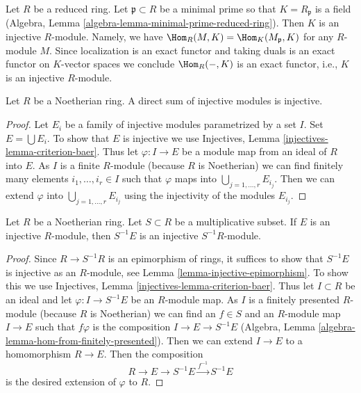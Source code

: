 \begin{example}
\label{example-reduced-ring-injective}
Let $R$ be a reduced ring. Let $\mathfrak p \subset R$ be a minimal prime
so that $K = R_\mathfrak p$ is a field
(Algebra, Lemma \ref{algebra-lemma-minimal-prime-reduced-ring}).
Then $K$ is an injective $R$-module. Namely, we have
$\Hom_R(M, K) = \Hom_K(M_\mathfrak p, K)$ for any $R$-module
$M$. Since localization is an exact functor and taking duals is
an exact functor on $K$-vector spaces we conclude $\Hom_R(-, K)$
is an exact functor, i.e., $K$ is an injective $R$-module.
\end{example}

\begin{lemma}
\label{lemma-sum-injective-modules}
Let $R$ be a Noetherian ring. A direct sum of injective modules
is injective.
\end{lemma}

\begin{proof}
Let $E_i$ be a family of injective modules parametrized by a set $I$.
Set $E = \bigcup E_i$. To show that $E$ is injective we use
Injectives, Lemma \ref{injectives-lemma-criterion-baer}.
Thus let $\varphi : I \to E$ be a module map from an ideal of $R$
into $E$. As $I$ is a finite $R$-module (because $R$ is Noetherian)
we can find finitely many elements $i_1, \ldots, i_r \in I$
such that $\varphi$ maps into $\bigcup_{j = 1, \ldots, r} E_{i_j}$.
Then we can extend $\varphi$ into $\bigcup_{j = 1, \ldots, r} E_{i_j}$
using the injectivity of the modules $E_{i_j}$.
\end{proof}

\begin{lemma}
\label{lemma-localization-injective-modules}
Let $R$ be a Noetherian ring. Let $S \subset R$ be a multiplicative
subset. If $E$ is an injective $R$-module, then $S^{-1}E$ is an
injective $S^{-1}R$-module.
\end{lemma}

\begin{proof}
Since $R \to S^{-1}R$ is an epimorphism of rings, it suffices
to show that $S^{-1}E$ is injective as an $R$-module, see
Lemma \ref{lemma-injective-epimorphism}.
To show this we use Injectives, Lemma \ref{injectives-lemma-criterion-baer}.
Thus let $I \subset R$ be an ideal and let
$\varphi : I \to S^{-1} E$ be an $R$-module map.
As $I$ is a finitely presented $R$-module (because $R$ is Noetherian)
we can find an $f \in S$ and an $R$-module map $I \to E$
such that $f\varphi$ is the composition $I \to E \to S^{-1}E$
(Algebra, Lemma \ref{algebra-lemma-hom-from-finitely-presented}).
Then we can extend $I \to E$ to a homomorphism $R \to E$.
Then the composition
$$
R \to E \to S^{-1}E \xrightarrow{f^{-1}} S^{-1}E
$$
is the desired extension of $\varphi$ to $R$.
\end{proof}

